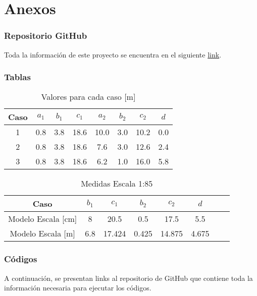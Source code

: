 \part{Anexos}

\section{Repositorio GitHub}

Toda la información de este proyecto se encuentra en el siguiente \href{https://github.com/LukasWolff2002/ENTREGA_3_MCOC}{link}.

\section{Tablas}

\begin{table}[H]
    \centering
    \begin{tabular}{|c|c|c|c|c|c|c|c|}
    \hline
    Caso & $a_1$ & $b_1$ & $c_1$ & $a_2$ & $b_2$ & $c_2$ & $d$ \\ \hline
    1    & 0.8   & 3.8   & 18.6  & 10.0  & 3.0   & 10.2  & 0.0 \\ \hline
    2    & 0.8   & 3.8   & 18.6  & 7.6   & 3.0   & 12.6  & 2.4  \\ \hline
    3    & 0.8   & 3.8   & 18.6  & 6.2   & 1.0   & 16.0  & 5.8  \\ \hline
    \end{tabular}
    \caption{Valores para cada caso [m]}
    \label{tab:medidas}
\end{table}

\begin{table}[H]
    \centering
    \begin{tabular}{|c|c|c|c|c|c|c|c|}
    \hline
    Caso  & $b_1$ & $c_1$  & $b_2$ & $c_2$ & $d$ \\ \hline
    Modelo Escala [cm] & 8  & 20.5  & 0.5   & 17.5  & 5.5 \\ \hline
    Modelo Escala [m] & 6.8  & 17.424 & 0.425   & 14.875  & 4.675  \\ \hline
    \end{tabular}
    \caption{Medidas Escala 1:85}
    \label{tab:medidas_escaladas}
\end{table}

\section{Códigos}

A continuación, se presentan links al repositorio de GitHub que contiene toda la información necesaria para ejecutar los códigos.

